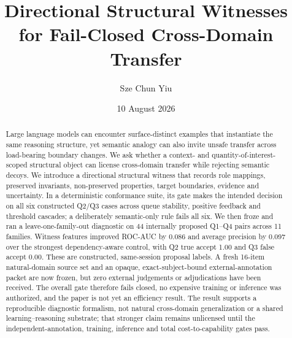 \documentclass[11pt]{article}
\title{Directional Structural Witnesses for Fail-Closed Cross-Domain Transfer}
\author{Sze Chun Yiu}
\date{10 August 2026}
\begin{document}
\maketitle
\begin{abstract}
Large language models can encounter surface-distinct examples that instantiate the same reasoning structure, yet semantic analogy can also invite unsafe transfer across load-bearing boundary changes. We ask whether a context- and quantity-of-interest-scoped structural object can license cross-domain transfer while rejecting semantic decoys. We introduce a directional structural witness that records role mappings, preserved invariants, non-preserved properties, target boundaries, evidence and uncertainty. In a deterministic conformance suite, its gate makes the intended decision on all six constructed Q2/Q3 cases across queue stability, positive feedback and threshold cascades; a deliberately semantic-only rule fails all six. We then froze and ran a leave-one-family-out diagnostic on 44 internally proposed Q1--Q4 pairs across 11 families. Witness features improved ROC-AUC by 0.086 and average precision by 0.097 over the strongest dependency-aware control, with Q2 true accept 1.00 and Q3 false accept 0.00. These are constructed, same-session proposal labels. A fresh 16-item natural-domain source set and an opaque, exact-subject-bound external-annotation packet are now frozen, but zero external judgements or adjudications have been received. The overall gate therefore fails closed, no expensive training or inference was authorized, and the paper is not yet an efficiency result. The result supports a reproducible diagnostic formalism, not natural cross-domain generalization or a shared learning--reasoning substrate; that stronger claim remains unlicensed until the independent-annotation, training, inference and total cost-to-capability gates pass.
\end{abstract}









\end{document}
